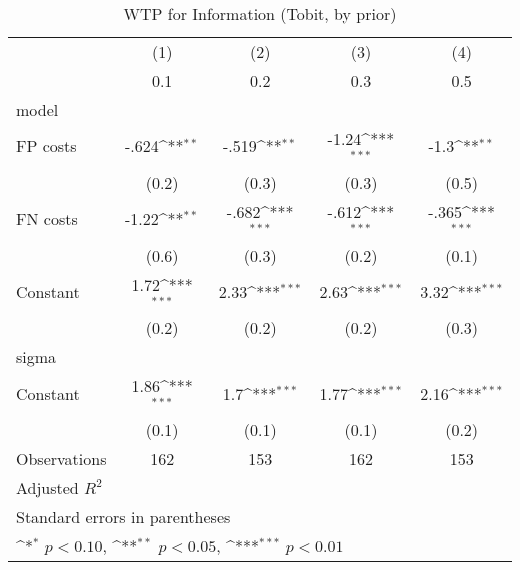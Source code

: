 \begin{table}[htbp]\centering
\def\sym#1{\ifmmode^{#1}\else\(^{#1}\)\fi}
\caption{WTP for Information (Tobit, by prior)}
\begin{tabular}{l*{4}{c}}
\hline\hline
                &\multicolumn{1}{c}{(1)}&\multicolumn{1}{c}{(2)}&\multicolumn{1}{c}{(3)}&\multicolumn{1}{c}{(4)}\\
                &\multicolumn{1}{c}{0.1}&\multicolumn{1}{c}{0.2}&\multicolumn{1}{c}{0.3}&\multicolumn{1}{c}{0.5}\\
\hline
model           &                  &                  &                  &                  \\
FP costs        &    -.624\sym{**} &    -.519\sym{**} &    -1.24\sym{***}&     -1.3\sym{**} \\
                &    (0.2)         &    (0.3)         &    (0.3)         &    (0.5)         \\
FN costs        &    -1.22\sym{**} &    -.682\sym{***}&    -.612\sym{***}&    -.365\sym{***}\\
                &    (0.6)         &    (0.3)         &    (0.2)         &    (0.1)         \\
Constant        &     1.72\sym{***}&     2.33\sym{***}&     2.63\sym{***}&     3.32\sym{***}\\
                &    (0.2)         &    (0.2)         &    (0.2)         &    (0.3)         \\
\hline
sigma           &                  &                  &                  &                  \\
Constant        &     1.86\sym{***}&      1.7\sym{***}&     1.77\sym{***}&     2.16\sym{***}\\
                &    (0.1)         &    (0.1)         &    (0.1)         &    (0.2)         \\
\hline
Observations    &      162         &      153         &      162         &      153         \\
Adjusted \(R^{2}\)&                  &                  &                  &                  \\
\hline\hline
\multicolumn{5}{l}{\footnotesize Standard errors in parentheses}\\
\multicolumn{5}{l}{\footnotesize \sym{*} \(p<0.10\), \sym{**} \(p<0.05\), \sym{***} \(p<0.01\)}\\
\end{tabular}
\end{table}
